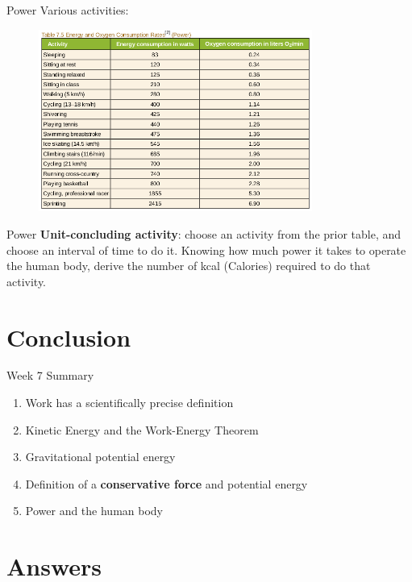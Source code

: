\documentclass{beamer}
\begin{document}
\begin{frame}{Power}
Various activities:
\begin{figure}
\centering
\includegraphics[width=0.8\textwidth]{figures/body3.png}
\end{figure}
\end{frame}

\begin{frame}{Power}
\textbf{Unit-concluding activity}: choose an activity from the prior table, and choose an interval of time to do it.  Knowing how much power it takes to operate the human body, derive the number of kcal (Calories) required to do that activity.
\end{frame}

\section{Conclusion}

\begin{frame}{Week 7 Summary}
\begin{enumerate}
\item \alert{Work} has a scientifically precise definition
\item Kinetic Energy and the \alert{Work-Energy Theorem}
\item Gravitational potential energy
\item Definition of a \textbf{conservative force} and potential energy
\item Power and the human body
\end{enumerate}
\end{frame}

\section{Answers}
\end{document}
